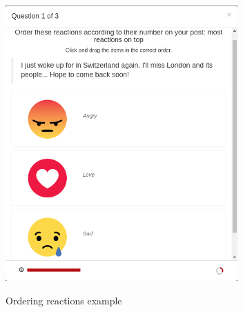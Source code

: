 \begin{figure}[!h]
\center
{\includegraphics[width=3.5in]{images/order_reactions.png} \label{fig:reactOrder}}
\caption{Ordering reactions example}
\end{figure}
